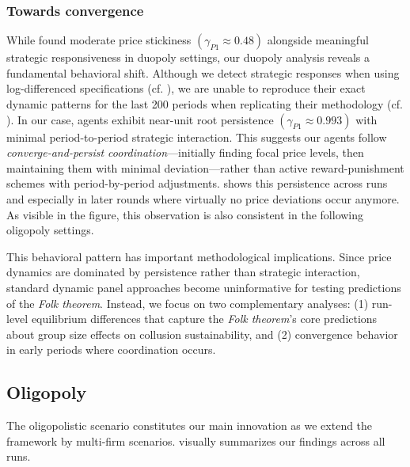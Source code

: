 
\subsubsection*{Towards convergence}

While \textcite[p. 18]{fish_algorithmic_2025} found moderate price stickiness $(\gamma_{P1} \approx 0.48)$ alongside meaningful strategic responsiveness in duopoly settings, our duopoly analysis reveals a fundamental behavioral shift. Although we detect strategic responses when using log-differenced specifications (cf. ), we are unable to reproduce their exact dynamic patterns for the last 200 periods when replicating their methodology (cf. ). In our case, agents exhibit near-unit root persistence $(\gamma_{P1} \approx 0.993)$ with minimal period-to-period strategic interaction. This suggests our agents follow \emph{converge-and-persist coordination}---initially finding focal price levels, then maintaining them with minimal deviation---rather than active reward-punishment schemes with period-by-period adjustments.  shows this persistence across runs and especially in later rounds where virtually no price deviations occur anymore. As visible in the figure, this observation is also consistent in the following oligopoly settings.

This behavioral pattern has important methodological implications. Since price dynamics are dominated by persistence rather than strategic interaction, standard dynamic panel approaches become uninformative for testing predictions of the \emph{Folk theorem}. Instead, we focus on two complementary analyses: (1) run-level equilibrium differences that capture the \emph{Folk theorem}'s core predictions about group size effects on collusion sustainability, and (2) convergence behavior in early periods where coordination occurs.


\subsection*{Oligopoly}

The oligopolistic scenario constitutes our main innovation as we extend the \textcite{fish_algorithmic_2025} framework by multi-firm scenarios.  visually summarizes our findings across all runs.

